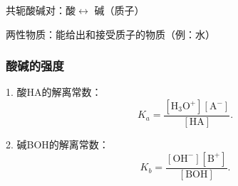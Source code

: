 \begin{notation}
    共轭酸碱对：酸$\leftrightarrow$ 碱（质子）

    两性物质：能给出和接受质子的物质（例：水）
\end{notation}
\subsubsection{酸碱的强度}%
\label{subsub:酸碱的强度}
1. 酸HA的解离常数： \[
    K_{a}=\frac{[\text{H}_3\text{O}^{+}][\text{A}^{-}]}{[\text{HA}]}
.\] 

2. 碱BOH的解离常数：
\[
    K_{b}=\frac{[\text{OH}^{-}][\text{B}^{+}]}{[\text{BOH}]}
.\] 
